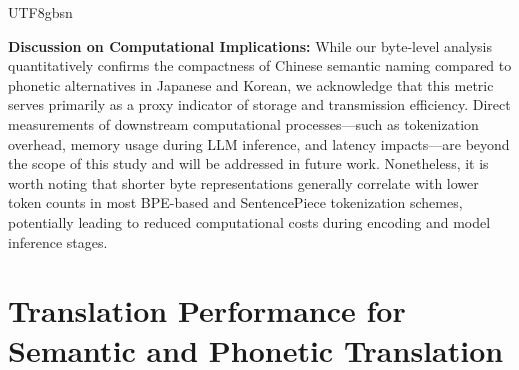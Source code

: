 \documentclass[conference]{IEEEtran}
\begin{document}
\begin{CJK*}{UTF8}{gbsn}

\textbf{Discussion on Computational Implications:}
While our byte-level analysis quantitatively confirms the compactness of Chinese semantic naming compared to phonetic alternatives in Japanese and Korean, we acknowledge that this metric serves primarily as a proxy indicator of storage and transmission efficiency. Direct measurements of downstream computational processes—such as tokenization overhead, memory usage during LLM inference, and latency impacts—are beyond the scope of this study and will be addressed in future work. Nonetheless, it is worth noting that shorter byte representations generally correlate with lower token counts in most BPE-based and SentencePiece tokenization schemes, potentially leading to reduced computational costs during encoding and model inference stages.

\section{Translation Performance for Semantic and Phonetic Translation}


   

\end{CJK*}
\end{document}
